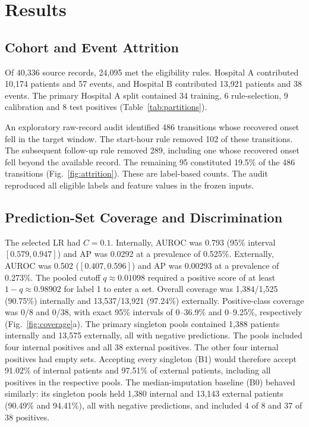 \documentclass[conference]{IEEEtran}
\begin{document}
\section{Results}

\subsection{Cohort and Event Attrition}

Of 40,336 source records, 24,095 met the eligibility rules. Hospital A contributed 10,174 patients and 57 events, and Hospital B contributed 13,921 patients and 38 events. The primary Hospital A split contained 34 training, 6 rule-selection, 9 calibration and 8 test positives (Table~\ref{tab:partitions}).

An exploratory raw-record audit identified 486 transitions whose recovered onset fell in the target window. The start-hour rule removed 102 of these transitions. The subsequent follow-up rule removed 289, including one whose recovered onset fell beyond the available record. The remaining 95 constituted 19.5\% of the 486 transitions (Fig.~\ref{fig:attrition}). These are label-based counts. The audit reproduced all eligible labels and feature values in the frozen inputs.

\subsection{Prediction-Set Coverage and Discrimination}

The selected LR had $C = 0.1$. Internally, AUROC was 0.793 (95\% interval $[0.579, 0.947]$) and AP was 0.0292 at a prevalence of 0.525\%. Externally, AUROC was 0.502 ($[0.407, 0.596]$) and AP was 0.00293 at a prevalence of 0.273\%. The pooled cutoff $q \approx 0.01098$ required a positive score of at least $1-q \approx 0.98902$ for label 1 to enter a set. Overall coverage was 1,384/1,525 (90.75\%) internally and 13,537/13,921 (97.24\%) externally. Positive-class coverage was 0/8 and 0/38, with exact 95\% intervals of 0--36.9\% and 0--9.25\%, respectively (Fig.~\ref{fig:coverage}a). The primary singleton pools contained 1,388 patients internally and 13,575 externally, all with negative predictions. The pools included four internal positives and all 38 external positives. The other four internal positives had empty sets. Accepting every singleton (B1) would therefore accept 91.02\% of internal patients and 97.51\% of external patients, including all positives in the respective pools. The median-imputation baseline (B0) behaved similarly: its singleton pools held 1,380 internal and 13,143 external patients (90.49\% and 94.41\%), all with negative predictions, and included 4 of 8 and 37 of 38 positives.
\end{document}
